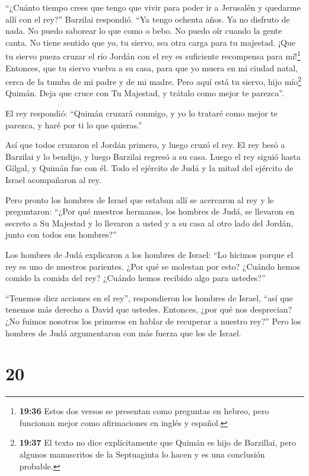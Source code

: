  ``¿Cuánto tiempo crees que tengo que vivir para poder ir a
Jerusalén y quedarme allí con el rey?'' Barzilai respondió.
 ``Ya tengo ochenta años. Ya no disfruto de nada. No puedo
saborear lo que como o bebo. No puedo oír cuando la gente canta. No
tiene sentido que yo, tu siervo, sea otra carga para tu majestad.
 ¡Que tu siervo pueza cruzar el río Jordán con el rey es
suficiente recompensa para mí!\footnote{\textbf{19:36} Estos dos versos
  se presentan como preguntas en hebreo, pero funcionan mejor como
  afirmaciones en inglés y español.}  Entonces, que tu
siervo vuelva a su casa, para que yo muera en mi ciudad natal, cerca de
la tumba de mi padre y de mi madre. Pero aquí está tu siervo, hijo
mío\footnote{\textbf{19:37} El texto no dice explícitamente que Quimán
  es hijo de Barzillai, pero algunos manuscritos de la Septuaginta lo
  hacen y es una conclusión probable.} Quimán. Deja que cruce con Tu
Majestad, y trátalo como mejor te parezca''.

 El rey respondió: ``Quimán cruzará conmigo, y yo lo
trataré como mejor te parezca, y haré por ti lo que quieras.''

 Así que todos cruzaron el Jordán primero, y luego cruzó el
rey. El rey besó a Barzilai y lo bendijo, y luego Barzilai regresó a su
casa.  Luego el rey siguió hasta Gilgal, y Quimán fue con
él. Todo el ejército de Judá y la mitad del ejército de Israel
acompañaron al rey.

 Pero pronto los hombres de Israel que estaban allí se
acercaron al rey y le preguntaron: ``¿Por qué nuestros hermanos, los
hombres de Judá, se llevaron en secreto a Su Majestad y lo llevaron a
usted y a su casa al otro lado del Jordán, junto con todos sus
hombres?''

 Los hombres de Judá explicaron a los hombres de Israel:
``Lo hicimos porque el rey es uno de nuestros parientes. ¿Por qué se
molestan por esto? ¿Cuándo hemos comido la comida del rey? ¿Cuándo hemos
recibido algo para ustedes?''

 ``Tenemos diez acciones en el rey'', respondieron los
hombres de Israel, ``así que tenemos más derecho a David que ustedes.
Entonces, ¿por qué nos desprecian? ¿No fuimos nosotros los primeros en
hablar de recuperar a nuestro rey?'' Pero los hombres de Judá
argumentaron con más fuerza que los de Israel.

\hypertarget{section-19}{%
\section{20}\label{section-19}}


